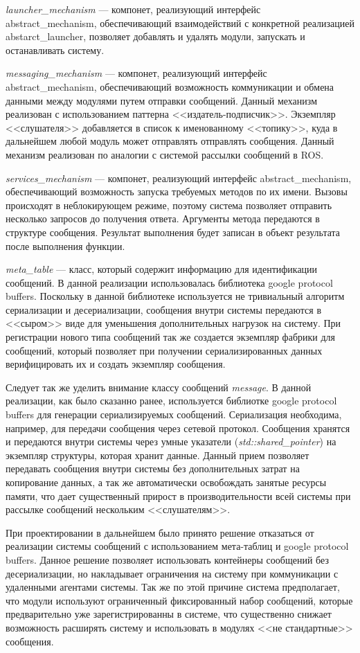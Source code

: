 \textit{launcher\_mechanism} --- компонет, реализующий интерфейс abstract\_mechanism, обеспечивающий взаимодействий с конкретной реализацией abstarct\_launcher, позволяет добавлять и удалять модули, запускать и останавливать систему.

\textit{messaging\_mechanism} --- компонет, реализующий интерфейс abstract\_mechanism, обеспечивающий возможность коммуникации и обмена данными между модулями путем отправки сообщений. Данный механизм реализован с использованием паттерна <<издатель-подписчик>>. Экземпляр <<слушателя>> добавляется в список к именованному <<топику>>, куда в дальнейшем любой модуль может отправлять отправлять сообщения. Данный механизм реализован по аналогии с системой рассылки сообщений в ROS.

\textit{services\_mechanism} --- компонет, реализующий интерфейс abstract\_mechanism, обеспечивающий возможность запуска требуемых методов по их имени. Вызовы происходят в неблокирующем режиме, поэтому система позволяет отправить несколько запросов до получения ответа. Аргументы метода передаются в структуре сообщения. Результат выполнения будет записан в объект результата после выполнения функции. 

\textit{meta\_table} --- класс, который содержит информацию для идентификации сообщений. В данной реализации использовалась библиотека google protocol buffers. Поскольку в данной библиотеке используется не тривиальный алгоритм сериализации и десериализации, сообщения внутри системы передаются в <<сыром>> виде для уменьшения дополнительных нагрузок на систему. При регистрации нового типа сообщений так же создается экземпляр фабрики для сообщений, который позволяет при получении сериализированных данных верифицировать их и создать экземпляр сообщения.

Следует так же уделить внимание классу сообщений \textit{message}. В данной реализации, как было сказанно ранее, используется библиотке google protocol buffers для генерации сериализируемых сообщений. Сериализация необходима, например, для передачи сообщения через сетевой протокол. Сообщения хранятся и передаются внутри системы через умные указатели (\textit{std::shared\_pointer}) на экземпляр структуры, которая хранит данные. Данный прием позволяет передавать сообщения внутри системы без дополнительных затрат на копирование данных, а так же автоматически освобождать занятые ресурсы памяти, что дает существенный прирост в производительности всей системы при рассылке сообщений нескольким <<слушателям>>.

При проектировании в дальнейшем было принято решение отказаться от реализации системы сообщений с использованием мета-таблиц и google protocol buffers. Данное решение позволяет использовать контейнеры сообщений без десериализации, но накладывает ограничения на систему при коммуникации с удаленными агентами системы. Так же по этой причине система предполагает, что модули используют ограниченный фиксированный набор сообщений, которые предварительно уже зарегистрированны в системе, что существенно снижает возможность расширять систему и использовать в модулях <<не стандартные>> сообщения.

